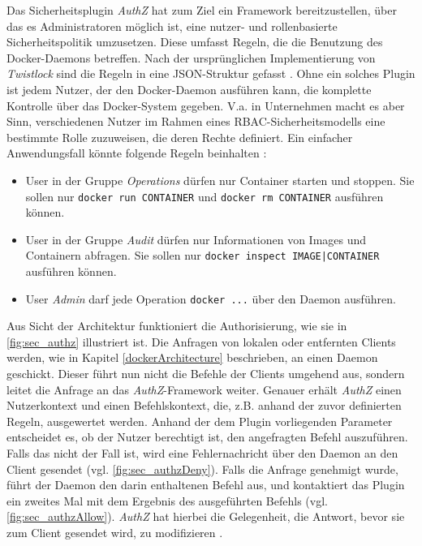 \documentclass[../main.tex]{subfiles}
\begin{document}
    Das Sicherheitsplugin \emph{AuthZ} hat zum Ziel ein Framework bereitzustellen, über das es Administratoren möglich ist, eine nutzer- und rollenbasierte Sicherheitspolitik umzusetzen. Diese umfasst Regeln, die die Benutzung des Docker-Daemons betreffen. Nach der ursprünglichen Implementierung von \emph{Twistlock} sind die Regeln in eine JSON-Struktur gefasst \cite{githubAuthZJSON}. Ohne ein solches Plugin ist jedem Nutzer, der den Docker-Daemon ausführen kann, die komplette Kontrolle über das Docker-System gegeben. V.a. in Unternehmen macht es aber Sinn, verschiedenen Nutzer im Rahmen eines RBAC-Sicherheitsmodells eine bestimmte Rolle zuzuweisen, die deren Rechte definiert. Ein einfacher Anwendungsfall könnte folgende Regeln beinhalten \cite{authzTwistlock}:

    \begin{itemize}
        \item User in der Gruppe \emph{Operations} dürfen nur Container starten und stoppen. Sie sollen nur \texttt{docker run CONTAINER} und \texttt{docker rm CONTAINER} ausführen können.
        \item User in der Gruppe \emph{Audit} dürfen nur Informationen von Images und Containern abfragen. Sie sollen nur \texttt{docker inspect IMAGE|CONTAINER} ausführen können.
        \item User \emph{Admin} darf jede Operation \texttt{docker ...} über den Daemon ausführen.
    \end{itemize}

    Aus Sicht der Architektur funktioniert die Authorisierung, wie sie in \fig \ref{fig:sec_authz} illustriert ist. Die Anfragen von lokalen oder entfernten Clients werden, wie in Kapitel \ref{dockerArchitecture} beschrieben, an einen Daemon geschickt. Dieser führt nun nicht die Befehle der Clients umgehend aus, sondern leitet die Anfrage an das \emph{AuthZ}-Framework weiter. Genauer erhält \emph{AuthZ} einen Nutzerkontext und einen Befehlskontext, die, z.B. anhand der zuvor definierten Regeln, ausgewertet werden. Anhand der dem Plugin vorliegenden Parameter entscheidet es, ob der Nutzer berechtigt ist, den angefragten Befehl auszuführen. Falls das nicht der Fall ist, wird eine Fehlernachricht über den Daemon an den Client gesendet (vgl. \fig \ref{fig:sec_authzDeny}). Falls die Anfrage genehmigt wurde, führt der Daemon den darin enthaltenen Befehl aus, und kontaktiert das Plugin ein zweites Mal mit dem Ergebnis des ausgeführten Befehls (vgl. \fig \ref{fig:sec_authzAllow}). \emph{AuthZ} hat hierbei die Gelegenheit, die Antwort, bevor sie zum Client gesendet wird, zu modifizieren \cite{githubAuthZDraft}\cite{authzTwistlock}.
\end{document}
